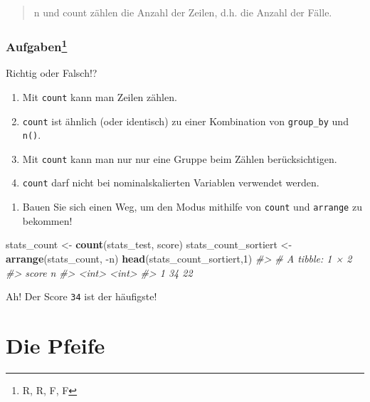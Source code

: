 \documentclass[12pt,ngerman,]{book}
\newenvironment{Shaded}{\begin{snugshade}}{\end{snugshade}}
\newcommand{\KeywordTok}[1]{\textcolor[rgb]{0.13,0.29,0.53}{\textbf{{#1}}}}
\newcommand{\DecValTok}[1]{\textcolor[rgb]{0.00,0.00,0.81}{{#1}}}
\newcommand{\StringTok}[1]{\textcolor[rgb]{0.31,0.60,0.02}{{#1}}}
\newcommand{\CommentTok}[1]{\textcolor[rgb]{0.56,0.35,0.01}{\textit{{#1}}}}
\newcommand{\NormalTok}[1]{{#1}}
\providecommand{\tightlist}{%
  \setlength{\itemsep}{0pt}\setlength{\parskip}{0pt}}
\let\rmarkdownfootnote\footnote%
\def\footnote{\protect\rmarkdownfootnote}
\renewenvironment{Shaded}{\begin{kframe}}{\end{kframe}}
\let\BeginKnitrBlock\begin \let\EndKnitrBlock\end
\begin{document}
\begin{quote}
n und count zählen die Anzahl der Zeilen, d.h. die Anzahl der Fälle.
\end{quote}

\subsubsection[Aufgaben]{\texorpdfstring{Aufgaben\footnote{R, R, F, F}}{Aufgaben}}\label{aufgaben-5}

\BeginKnitrBlock{rmdexercises}
Richtig oder Falsch!?

\begin{enumerate}
\def\labelenumi{\arabic{enumi}.}
\tightlist
\item
  Mit \texttt{count} kann man Zeilen zählen.
\item
  \texttt{count} ist ähnlich (oder identisch) zu einer Kombination von
  \texttt{group\_by} und \texttt{n()}.
\item
  Mit \texttt{count} kann man nur nur eine Gruppe beim Zählen
  berücksichtigen.
\item
  \texttt{count} darf nicht bei nominalskalierten Variablen verwendet
  werden.
\end{enumerate}
\EndKnitrBlock{rmdexercises}

\begin{enumerate}
\def\labelenumi{\arabic{enumi}.}
\tightlist
\item
  Bauen Sie sich einen Weg, um den Modus mithilfe von \texttt{count} und
  \texttt{arrange} zu bekommen!
\end{enumerate}

\begin{Shaded}
\begin{Highlighting}[]
\NormalTok{stats_count <-}\StringTok{ }\KeywordTok{count}\NormalTok{(stats_test, score)}
\NormalTok{stats_count_sortiert <-}\StringTok{ }\KeywordTok{arrange}\NormalTok{(stats_count, -n)}
\KeywordTok{head}\NormalTok{(stats_count_sortiert,}\DecValTok{1}\NormalTok{)}
\CommentTok{#> # A tibble: 1 × 2}
\CommentTok{#>   score     n}
\CommentTok{#>   <int> <int>}
\CommentTok{#> 1    34    22}
\end{Highlighting}
\end{Shaded}

Ah! Der Score \texttt{34} ist der häufigste!

\section{Die Pfeife}\label{die-pfeife}
\end{document}
